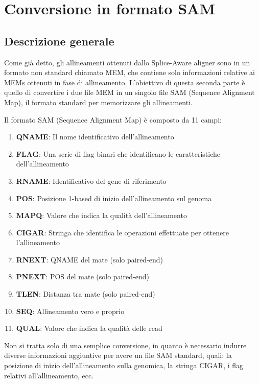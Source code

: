 \section{Conversione in formato SAM}

\subsection{Descrizione generale}
Come già detto, gli allineamenti ottenuti dallo Splice-Aware aligner sono in un formato non standard chiamato MEM, che contiene solo informazioni relative ai MEMs ottenuti in fase di allineamento. L'obiettivo di questa seconda parte è quello di convertire i due file MEM in un singolo file SAM (Sequence Alignment Map), il formato standard per memorizzare gli allineamenti.

Il formato SAM (Sequence Alignment Map) è composto da 11 campi:

\begin{enumerate}
	\item \textbf{QNAME}: Il nome identificativo dell'allineamento
	\item \textbf{FLAG}: Una serie di flag binari che identificano le caratteristiche dell'allineamento
	\item \textbf{RNAME}: Identificativo del gene di riferimento
	\item \textbf{POS}: Posizione 1-based di inizio dell'allineamento sul genoma
	\item \textbf{MAPQ}:  Valore che indica la qualità dell'allineamento
	\item \textbf{CIGAR}: Stringa che identifica le operazioni effettuate per ottenere l'allineamento
	\item \textbf{RNEXT}: QNAME del mate (solo paired-end)
	\item \textbf{PNEXT}: POS del mate	(solo paired-end)
	\item \textbf{TLEN}:  Distanza tra mate (solo paired-end)
	\item \textbf{SEQ}:  	Allineamento vero e proprio
	\item \textbf{QUAL}: Valore che indica la qualità delle read
\end{enumerate}

Non si tratta solo di una semplice conversione, in quanto è necessario indurre diverse informazioni aggiuntive per avere un file SAM standard, quali: la posizione di inizio dell'allineamento sulla genomica, la stringa CIGAR, i flag relativi all'allineamento, ecc. 

